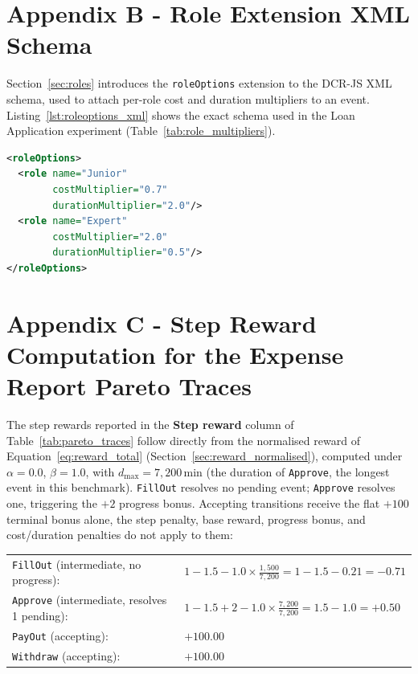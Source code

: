 \chapter{Appendix B - Role Extension XML Schema}
\label{app:roleoptions_xml}

Section~\ref{sec:roles} introduces the \texttt{roleOptions} extension
to the \ac{DCR}-JS XML schema, used to attach per-role cost and
duration multipliers to an event. Listing~\ref{lst:roleoptions_xml}
shows the exact schema used in the Loan Application experiment
(Table~\ref{tab:role_multipliers}).

\begin{lstlisting}[language=XML, caption={\texttt{roleOptions} XML extension, Loan Application Junior/Expert profiles.}, label={lst:roleoptions_xml}]
<roleOptions>
  <role name="Junior"
        costMultiplier="0.7"
        durationMultiplier="2.0"/>
  <role name="Expert"
        costMultiplier="2.0"
        durationMultiplier="0.5"/>
</roleOptions>
\end{lstlisting}


\chapter{Appendix C - Step Reward Computation for the Expense Report Pareto Traces}
\label{app:expense_step_reward}

The step rewards reported in the \textbf{Step reward} column of
Table~\ref{tab:pareto_traces} follow directly from the normalised
reward of Equation~\ref{eq:reward_total} (Section~\ref{sec:reward_normalised}),
computed under $\alpha=0.0$, $\beta=1.0$, with $d_{\max}=7{,}200$\,min
(the duration of \texttt{Approve}, the longest event in this benchmark).
\texttt{FillOut} resolves no pending event; \texttt{Approve} resolves
one, triggering the $+2$ progress bonus. Accepting transitions receive
the flat $+100$ terminal bonus alone, the step penalty, base reward,
progress bonus, and cost/duration penalties do not apply to them:

\medskip
\noindent
\begin{tabular}{@{}ll@{}}
\texttt{FillOut} (intermediate, no progress): &
  $1 - 1.5 - 1.0 \times \frac{1{,}500}{7{,}200}
  = 1 - 1.5 - 0.21 = -0.71$ \\[4pt]
\texttt{Approve} (intermediate, resolves 1 pending): &
  $1 - 1.5 + 2 - 1.0 \times \frac{7{,}200}{7{,}200}
  = 1.5 - 1.0 = +0.50$ \\[4pt]
\texttt{PayOut} (accepting): &
  $+100.00$ \\[4pt]
\texttt{Withdraw} (accepting): &
  $+100.00$ \\
\end{tabular}

